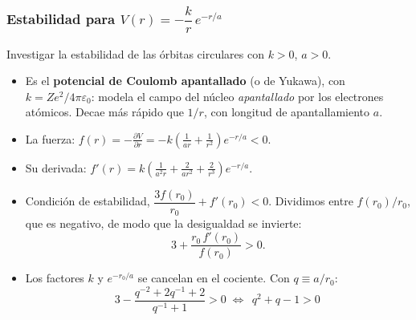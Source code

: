\documentclass[10pt]{beamer}
\begin{document}
\begin{frame}
\frametitle{Estabilidad para $V(r)=-\dfrac{k}{r}\,e^{-r/a}$}
\small
Investigar la estabilidad de las órbitas circulares con $k>0$, $a>0$.
\begin{itemize}
  \item<1-> Es el \textbf{potencial de Coulomb apantallado} (o de Yukawa), con
        $k=Ze^{2}/4\pi\varepsilon_0$: modela el campo del núcleo
        \emph{apantallado} por los electrones atómicos. Decae más rápido que
        $1/r$, con longitud de apantallamiento $a$.
  \item<2-> La fuerza:
        $\displaystyle f(r)=-\frac{\partial V}{\partial r}
        =-k\left(\frac{1}{ar}+\frac{1}{r^{2}}\right)e^{-r/a}<0 .$
  \item<3-> Su derivada:
        $\displaystyle f'(r)=k\left(\frac{1}{a^{2}r}+\frac{2}{ar^{2}}
        +\frac{2}{r^{3}}\right)e^{-r/a} .$
  \item<4-> Condición de estabilidad,
        $\dfrac{3f(r_0)}{r_0}+f'(r_0)<0$. Dividimos entre $f(r_0)/r_0$, que es
        \alert{negativo}, de modo que la desigualdad \alert{se invierte}:
        \[ 3+\frac{r_0\,f'(r_0)}{f(r_0)}>0 . \]
  \item<5-> Los factores $k$ y $e^{-r_0/a}$ se cancelan en el cociente. Con
        $q\equiv a/r_0$:
        \[ 3-\frac{q^{-2}+2q^{-1}+2}{q^{-1}+1}>0
           \;\Longleftrightarrow\;
           \boxed{\,q^{2}+q-1>0\,} \]
\end{itemize}
\end{frame}
\end{document}
